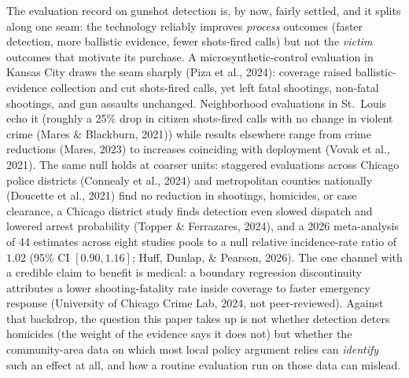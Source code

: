 \documentclass[12pt]{article}
\begin{document}
The evaluation record on gunshot detection is, by now, fairly settled, and it splits along
one seam: the technology reliably improves \emph{process} outcomes (faster detection, more
ballistic evidence, fewer shots-fired calls) but not the \emph{victim} outcomes that
motivate its purchase. A microsynthetic-control evaluation in Kansas City draws the seam
sharply (Piza et al., 2024): coverage raised ballistic-evidence collection and cut
shots-fired calls, yet left fatal shootings, non-fatal shootings, and gun assaults
unchanged. Neighborhood evaluations in St.\ Louis echo it (roughly a 25\% drop in citizen
shots-fired calls with no change in violent crime (Mares \& Blackburn, 2021)) while results
elsewhere range from crime reductions (Mares, 2023) to increases coinciding with deployment
(Vovak et al., 2021). The same null holds at coarser units: staggered evaluations across
Chicago police districts (Connealy et al., 2024) and metropolitan counties nationally
(Doucette et al., 2021) find no reduction in shootings, homicides, or case clearance, a
Chicago district study finds detection even slowed dispatch and lowered arrest probability
(Topper \& Ferrazares, 2024), and a 2026 meta-analysis of 44 estimates across eight studies
pools to a null relative incidence-rate ratio of $1.02$ (95\% CI $[0.90, 1.16]$; Huff,
Dunlap, \& Pearson, 2026). The one channel with a credible claim to benefit is medical: a
boundary regression discontinuity attributes a lower shooting-fatality rate inside coverage
to faster emergency response (University of Chicago Crime Lab, 2024, not peer-reviewed). Against that
backdrop, the question this paper takes up is not whether detection deters homicides (the
weight of the evidence says it does not) but whether the community-area data on which most
local policy argument relies can \emph{identify} such an effect at all, and how a routine
evaluation run on those data can mislead.
\end{document}

